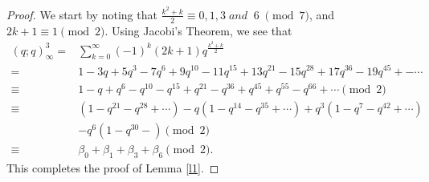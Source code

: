 \documentclass[10pt,a4paper]{amsart}
\begin{document}
\begin{proof}
	We start by noting that $\frac{k^2+k}{2}\equiv0,1,3 \; and \;\; 6 \; \pmod{7}$, and ${2k+1} \equiv 1 \pmod{2}$.
	Using Jacobi's Theorem, we see that
	\begin{align*}
		(q;q)_\infty^{3} 
		=& \sum_{k=0}^{\infty} (-1)^{k} (2k + 1) q^{\frac{k^{2} + k}{2}} \\
		=& 1 - 3q + 5q^{3} - 7q^{6} + 9q^{10} - 11q^{15} + 13q^{21} - 15q^{28} + 17q^{36}
		- 19q^{45} + - \cdots\\
		\equiv& 1 - q + q^{6} - q^{10} - q^{15} + q^{21} - q^{36} + q^{45} + q^{55} - q^{66} + \cdots \pmod{2}\\
		\equiv &(1 - q^{21} - q^{28} + \cdots)
		- q(1 - q^{14} - q^{35} + \cdots)
		+ q^{3}(1 - q^{7} - q^{42} + \cdots)\\
		&-q^6(1-q^{30}-) \pmod{2}\\
		\equiv& \beta_0+\beta_1+\beta_3+\beta_6\pmod{2}.
	\end{align*}
This completes the proof of Lemma \ref{l1}.
\end{proof}
\end{document}
